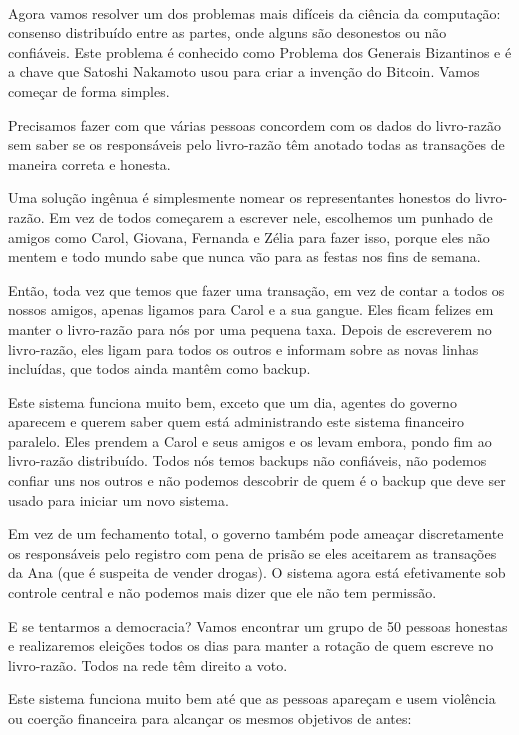\paragraph{}
Agora vamos resolver um dos problemas mais difíceis da ciência da computação: consenso distribuído entre as partes, onde alguns são desonestos ou não confiáveis. Este problema é conhecido como Problema dos Generais Bizantinos e é a chave que Satoshi Nakamoto usou para criar a invenção do Bitcoin. Vamos começar de forma simples.

Precisamos fazer com que várias pessoas concordem com os dados do livro-razão sem saber se os  responsáveis pelo livro-razão têm anotado todas as transações de maneira correta e honesta.

Uma solução ingênua é simplesmente nomear os representantes honestos do livro-razão. Em vez de todos começarem a escrever nele, escolhemos um punhado de amigos como Carol, Giovana, Fernanda e Zélia para fazer isso, porque eles não mentem e todo mundo sabe que nunca vão para as festas nos fins de semana.

Então, toda vez que temos que fazer uma transação, em vez de contar a todos os nossos amigos, apenas ligamos para Carol e a sua gangue. Eles ficam felizes em manter o livro-razão para nós por uma pequena taxa. Depois de escreverem no livro-razão, eles ligam para todos os outros e informam sobre as novas linhas incluídas, que todos ainda mantêm como backup.

Este sistema funciona muito bem, exceto que um dia, agentes do governo aparecem e querem saber quem está administrando este sistema financeiro paralelo. Eles prendem a Carol e seus amigos e os levam embora, pondo fim ao livro-razão distribuído. Todos nós temos backups não confiáveis, não podemos confiar uns nos outros e não podemos descobrir de quem é o backup que deve ser usado para iniciar um novo sistema.

Em vez de um fechamento total, o governo também pode ameaçar discretamente os responsáveis pelo registro com pena de prisão se eles aceitarem as transações da Ana (que é suspeita de vender drogas). O sistema agora está efetivamente sob controle central e não podemos mais dizer que ele não tem permissão.

E se tentarmos a democracia? Vamos encontrar um grupo de 50 pessoas honestas e realizaremos eleições todos os dias para manter a rotação de quem escreve no livro-razão. Todos na rede têm direito a voto.

Este sistema funciona muito bem até que as pessoas apareçam e usem violência ou coerção financeira para alcançar os mesmos objetivos de antes:

